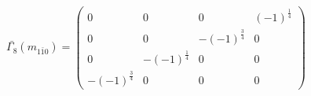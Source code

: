 %
\begin{equation}
	\bar{\Gamma_8}(m_{1\bar{1}0})=\begin{pmatrix}
		0 &0 &0 &(-1)^{\frac{1}{4}}\\
		0&0&-(-1)^{\frac{3}{4}}&0\\
		0&-(-1)^{\frac{1}{4}}&0&0\\
		-(-1)^{\frac{3}{4}}&0&0&0
	\end{pmatrix}
\end{equation}
